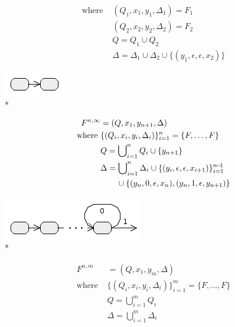 \documentclass{article}
\newenvironment{Xfig}
    {\par\medskip\noindent\minipage{\linewidth}\begin{center}}
    {\end{center}\endminipage\par\medskip}
\theoremstyle{definition}
\begin{document}
\begin{multicols}{2}
\begin{align*}
        \text{where }
            & (Q_1, x_1, y_1, \Delta_1) = F_1 \\
            & (Q_2, x_2, y_2, \Delta_2) = F_2 \\
            & Q = Q_1 \cup Q_2  \\
            & \Delta = \Delta_1 \cup \Delta_2 \cup \{ (y_1, \epsilon, \epsilon, x_2) \}
    \end{align*}
%
\begin{Xfig}
\includegraphics[width=0.25\linewidth]{img/tnfa_concat.png}\\*
\end{Xfig}
%
    \begin{align*}
        F^{n,\infty} &= (Q, x_1, y_{n+1}, \Delta) \\
        \text{where }
            & \{(Q_i, x_i, y_i, \Delta_i)\}_{i=1}^n = \{F, \dots, F\} \\
            & Q = \bigcup\nolimits_{i=1}^n Q_i \cup \{ y_{n+1} \} \\
            & \Delta = \bigcup\nolimits_{i=1}^n \Delta_i
                \cup \{(y_i, \epsilon, \epsilon, x_{i+1})\}_{i=1}^{n\!-\!1} \\
                & \hphantom{\hspace{2em}}
                    \cup \{ (y_n, 0, \epsilon, x_n), (y_n, 1, \epsilon, y_{n+1}) \}
    \end{align*}
%
\begin{Xfig}
\includegraphics[width=0.55\linewidth]{img/tnfa_repeat_unbound.png}\\*
\end{Xfig}
%
    \begin{align*}
        F^{n,m} &= (Q, x_1, y_m, \Delta) \\
        \text{where }
            & \{(Q_i, x_i, y_i, \Delta_i)\}_{i=1}^m = \{F, \dots, F\} \\
            & Q = \bigcup\nolimits_{i=1}^m Q_i \\
            & \Delta = \bigcup\nolimits_{i=1}^m \Delta_i

\end{align*}
\end{multicols}
\end{document}
